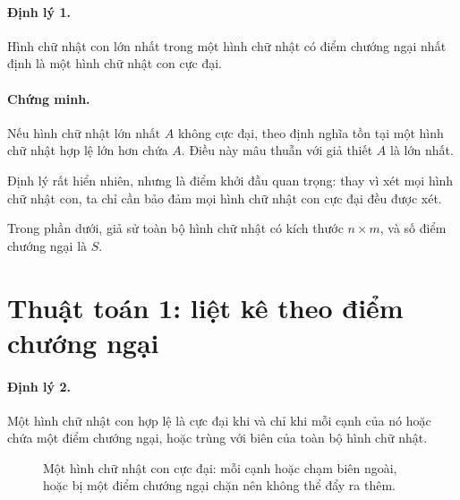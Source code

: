 \documentclass[11pt]{article}
\begin{document}
\paragraph{Định lý 1.}
Hình chữ nhật con lớn nhất trong một hình chữ nhật có điểm chướng ngại nhất
định là một hình chữ nhật con cực đại.

\paragraph{Chứng minh.}
Nếu hình chữ nhật lớn nhất \(A\) không cực đại, theo định nghĩa tồn tại một
hình chữ nhật hợp lệ lớn hơn chứa \(A\). Điều này mâu thuẫn với giả thiết
\(A\) là lớn nhất.

Định lý rất hiển nhiên, nhưng là điểm khởi đầu quan trọng: thay vì xét mọi
hình chữ nhật con, ta chỉ cần bảo đảm mọi hình chữ nhật con cực đại đều được
xét.

Trong phần dưới, giả sử toàn bộ hình chữ nhật có kích thước \(n\times m\), và
số điểm chướng ngại là \(S\).

\section{Thuật toán 1: liệt kê theo điểm chướng ngại}

\paragraph{Định lý 2.}
Một hình chữ nhật con hợp lệ là cực đại khi và chỉ khi mỗi cạnh của nó hoặc
chứa một điểm chướng ngại, hoặc trùng với biên của toàn bộ hình chữ nhật.

\begin{figure}[ht]
\centering
{}
\caption{Một hình chữ nhật con cực đại: mỗi cạnh hoặc chạm biên ngoài, hoặc
bị một điểm chướng ngại chặn nên không thể đẩy ra thêm.}
\end{figure}
\end{document}
